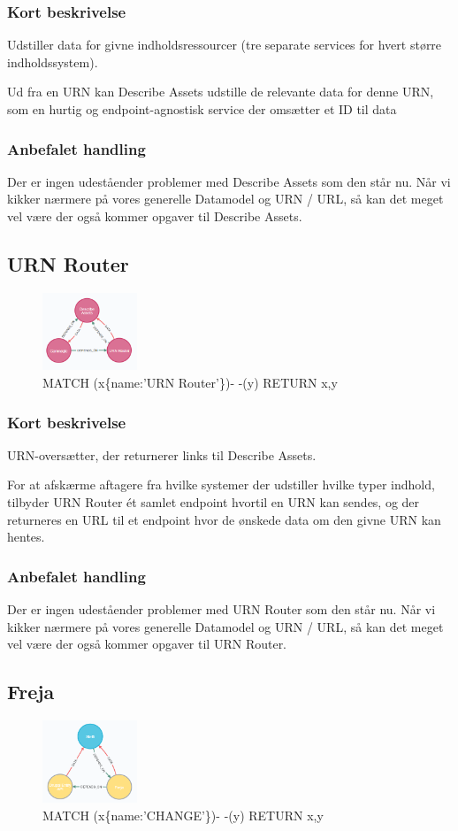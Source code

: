 \documentclass{article}
\begin{document}
\subsubsection{Kort beskrivelse}
Udstiller data for givne indholdsressourcer (tre separate services for hvert større indholdssystem).

Ud fra en URN kan Describe Assets udstille de relevante data for denne URN, som en hurtig og endpoint-agnostisk service der omsætter et ID til data
\subsubsection{Anbefalet handling}
Der er ingen udeståender problemer med Describe Assets som den står nu. Når vi kikker nærmere på vores generelle Datamodel og URN / URL, så kan det meget vel være der også kommer opgaver til Describe Assets.


\subsection{URN Router}
\begin{figure}[h]
\includegraphics[width=80pt]{URNRouter.PNG}
\caption{MATCH (x\{name:'URN Router'\})- -(y) RETURN x,y}
\end{figure}
\subsubsection{Kort beskrivelse}
URN-oversætter, der returnerer links til Describe Assets.

For at afskærme aftagere fra hvilke systemer der udstiller hvilke typer indhold, tilbyder URN Router ét samlet endpoint hvortil en URN kan sendes, og der returneres en URL til et endpoint hvor de ønskede data om den givne URN kan hentes.
\subsubsection{Anbefalet handling}
Der er ingen udeståender problemer med URN Router som den står nu. Når vi kikker nærmere på vores generelle Datamodel og URN / URL, så kan det meget vel være der også kommer opgaver til URN Router.


\subsection{Freja}
\begin{figure}[h]
\includegraphics[width=80pt]{Freja.PNG}
\caption{MATCH (x\{name:'CHANGE'\})- -(y) RETURN x,y}
\end{figure}
\end{document}
